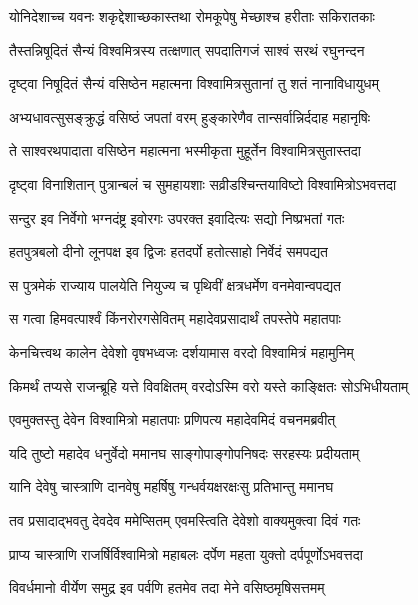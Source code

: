 \twolineshloka
{योनिदेशाच्च यवनः शकृद्देशाच्छकास्तथा}
{रोमकूपेषु मेच्छाश्च हरीताः सकिरातकाः} %

\twolineshloka
{तैस्तन्निषूदितं सैन्यं विश्वमित्रस्य तत्क्षणात्}
{सपदातिगजं साश्वं सरथं रघुनन्दन} %

\twolineshloka
{दृष्ट्वा निषूदितं सैन्यं वसिष्ठेन महात्मना}
{विश्वामित्रसुतानां तु शतं नानाविधायुधम्} %

\twolineshloka
{अभ्यधावत्सुसङ्क्रुद्धं वसिष्ठं जपतां वरम्}
{हुङ्कारेणैव तान्सर्वान्निर्ददाह महानृषिः} %

\twolineshloka
{ते साश्वरथपादाता वसिष्ठेन महात्मना}
{भस्मीकृता मुहूर्तेन विश्वामित्रसुतास्तदा} %

\twolineshloka
{दृष्ट्वा विनाशितान् पुत्रान्बलं च सुमहायशाः}
{सव्रीडश्चिन्तयाविष्टो विश्वामित्रोऽभवत्तदा} %

\twolineshloka
{सन्दुर इव निर्वेगो भग्नदंष्ट्र इवोरगः}
{उपरक्त इवादित्यः सद्यो निष्प्रभतां गतः} %

\twolineshloka
{हतपुत्रबलो दीनो लूनपक्ष इव द्विजः}
{हतदर्पो हतोत्साहो निर्वेदं समपद्यत} %

\twolineshloka
{स पुत्रमेकं राज्याय पालयेति नियुज्य च}
{पृथिवीं क्षत्रधर्मेण वनमेवान्वपद्यत} %

\twolineshloka
{स गत्वा हिमवत्पार्श्वं किंनरोरगसेवितम्}
{महादेवप्रसादार्थं तपस्तेपे महातपाः} %

\twolineshloka
{केनचित्त्वथ कालेन देवेशो वृषभध्वजः}
{दर्शयामास वरदो विश्वामित्रं महामुनिम्} %

\twolineshloka
{किमर्थं तप्यसे राजन्ब्रूहि यत्ते विवक्षितम्}
{वरदोऽस्मि वरो यस्ते काङ्क्षितः सोऽभिधीयताम्} %

\twolineshloka
{एवमुक्तस्तु देवेन विश्वामित्रो महातपाः}
{प्रणिपत्य महादेवमिदं वचनमब्रवीत्} %

\twolineshloka
{यदि तुष्टो महादेव धनुर्वेदो ममानघ}
{साङ्गोपाङ्गोपनिषदः सरहस्यः प्रदीयताम्} %

\twolineshloka
{यानि देवेषु चास्त्राणि दानवेषु महर्षिषु}
{गन्धर्वयक्षरक्षःसु प्रतिभान्तु ममानघ} %

\twolineshloka
{तव प्रसादाद्भवतु देवदेव ममेप्सितम्}
{एवमस्त्विति देवेशो वाक्यमुक्त्वा दिवं गतः} %

\twolineshloka
{प्राप्य चास्त्राणि राजर्षिर्विश्वामित्रो महाबलः}
{दर्पेण महता युक्तो दर्पपूर्णोऽभवत्तदा} %

\twolineshloka
{विवर्धमानो वीर्येण समुद्र इव पर्वणि}
{हतमेव तदा मेने वसिष्ठमृषिसत्तमम्} %

